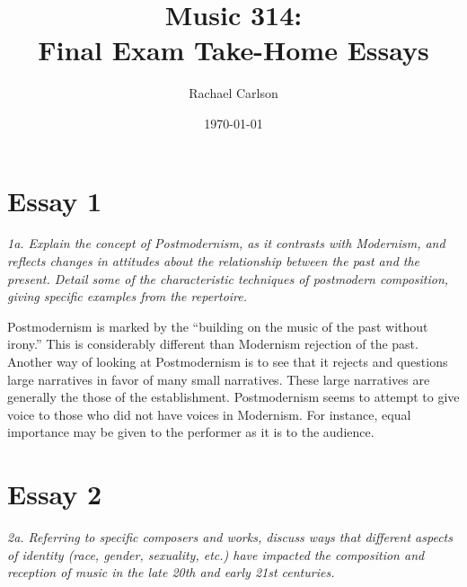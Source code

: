 \documentclass[12pt]{article}
\author{Rachael Carlson}
\title{Music 314: \\ Final Exam Take-Home Essays}
\date{\today}
\begin{document}
\maketitle

\section*{Essay 1}
\label{sec:question-1}

\emph{1a. Explain the concept of Postmodernism, as it contrasts with
  Modernism, and reflects changes in attitudes about the relationship
  between the past and the present. Detail some of the characteristic
  techniques of postmodern composition, giving specific examples from
  the repertoire.}

Postmodernism is marked by the ``building on the music of the past
without irony.''\autocite{week9} This is considerably different than
Modernism rejection of the past. Another way of looking at
Postmodernism is to see that it rejects and questions large narratives
in favor of many small narratives. These large narratives are
generally the those of the establishment. Postmodernism seems to
attempt to give voice to those who did not have voices in
Modernism. For instance, equal importance may be given to the
performer as it is to the audience. 

\section*{Essay 2}
\label{sec:essay-2}

\emph{2a. Referring to specific composers and works, discuss ways that different aspects of identity (race, gender, sexuality, etc.) have impacted the composition and reception of music in the late 20th and early 21st centuries.}
\end{document}
